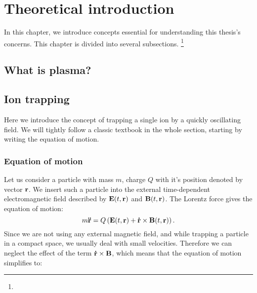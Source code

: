 \chapter{Theoretical introduction}
\label{chap:intro}

In this chapter, we introduce concepts essential for understanding this thesis's concerns. This chapter is divided into several subsections. \footnote{} 

\section{What is plasma?}

\section{Ion trapping}
Here we introduce the concept of trapping a single ion by a quickly oscillating field. We will tightly follow a classic textbook \cite{gerlich1992inhomogeneous} in the whole section, starting by writing the equation of motion.
\subsection{Equation of motion}
Let us consider a particle with mass $m$, charge $Q$ with it's position denoted by vector $\vb{r}$. We insert such a particle into the external time-dependent electromagnetic field described by $\vb{E}(t,\vb{r})$ and $\vb{B}(t,\vb{r})$. The Lorentz force gives the equation of motion:
\begin{equation}
	m \vb{\ddot{r}} = Q \left(\vb{E}(t,\vb{r}) + \vb{\dot{r}} \times \vb{B}(t,\vb{r})\right).
\end{equation}
Since we are not using any external magnetic field, and while trapping a particle in a compact space, we usually deal with small velocities. Therefore we can neglect the effect of the term $\vb{\dot{r}} \times \vb{B}$, which means that the equation of motion simplifies to:


